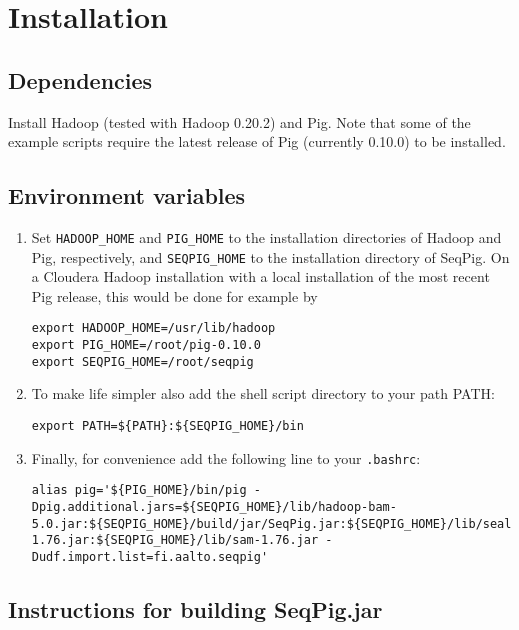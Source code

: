 
\section{Installation}

\subsection{Dependencies}
Install Hadoop (tested with Hadoop 0.20.2) and Pig. Note that some of the
example scripts require the latest release of Pig (currently 0.10.0) to
be installed.

\subsection{Environment variables}
\begin{enumerate}
\item Set {\tt HADOOP\_HOME} and {\tt PIG\_HOME} to the installation
directories of Hadoop and Pig, respectively, and {\tt SEQPIG\_HOME} to
the installation directory of SeqPig. On a Cloudera Hadoop installation
with a local installation of the most recent Pig release, this would be
done for example by
\begin{lstlisting} 
export HADOOP_HOME=/usr/lib/hadoop
export PIG_HOME=/root/pig-0.10.0
export SEQPIG_HOME=/root/seqpig 
\end{lstlisting}
%
\item To make life simpler also add the shell script directory to your path PATH:
%
\begin{lstlisting} 
export PATH=${PATH}:${SEQPIG_HOME}/bin
\end{lstlisting}
%
\item Finally, for convenience add the following line to your {\tt .bashrc}:
%
\begin{lstlisting} 
alias pig='${PIG_HOME}/bin/pig -Dpig.additional.jars=${SEQPIG_HOME}/lib/hadoop-bam-5.0.jar:${SEQPIG_HOME}/build/jar/SeqPig.jar:${SEQPIG_HOME}/lib/seal.jar:${SEQPIG_HOME}/lib/picard-1.76.jar:${SEQPIG_HOME}/lib/sam-1.76.jar -Dudf.import.list=fi.aalto.seqpig' 
\end{lstlisting}
%
\end{enumerate}

\subsection{Instructions for building SeqPig.jar}

